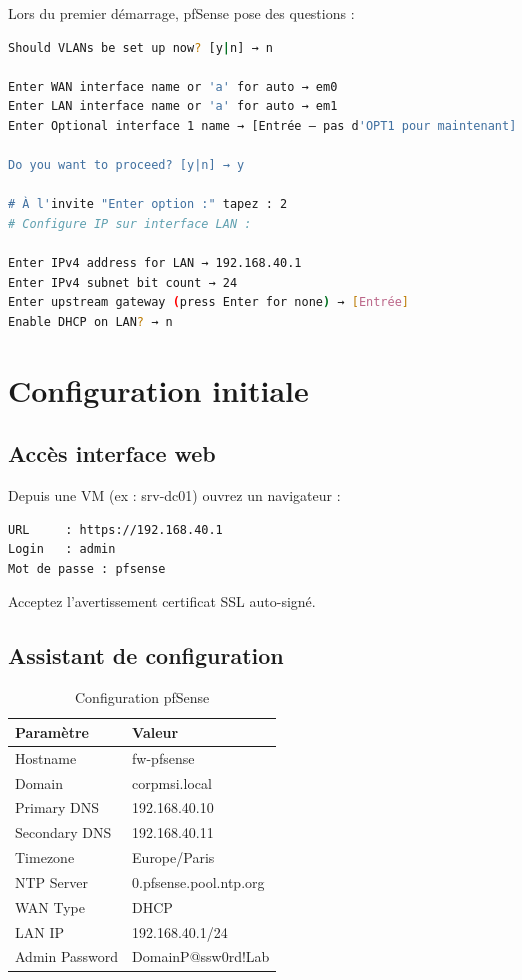 Lors du premier démarrage, pfSense pose des questions :

\begin{lstlisting}[language=bash]
Should VLANs be set up now? [y|n] → n

Enter WAN interface name or 'a' for auto → em0
Enter LAN interface name or 'a' for auto → em1
Enter Optional interface 1 name → [Entrée — pas d'OPT1 pour maintenant]

Do you want to proceed? [y|n] → y

# À l'invite "Enter option :" tapez : 2
# Configure IP sur interface LAN :

Enter IPv4 address for LAN → 192.168.40.1
Enter IPv4 subnet bit count → 24
Enter upstream gateway (press Enter for none) → [Entrée]
Enable DHCP on LAN? → n
\end{lstlisting}

\section{Configuration initiale}

\subsection{Accès interface web}

Depuis une VM (ex : srv-dc01) ouvrez un navigateur :

\begin{lstlisting}
URL     : https://192.168.40.1
Login   : admin
Mot de passe : pfsense
\end{lstlisting}

Acceptez l'avertissement certificat SSL auto-signé.

\subsection{Assistant de configuration}

\begin{table}[H]
    \centering
    \begin{tabularx}{\textwidth}{|l|p{5cm}|}
        \hline
        \textbf{Paramètre} & \textbf{Valeur} \\
        \hline
        Hostname & fw-pfsense \\
        \hline
        Domain & corpmsi.local \\
        \hline
        Primary DNS & 192.168.40.10 \\
        \hline
        Secondary DNS & 192.168.40.11 \\
        \hline
        Timezone & Europe/Paris \\
        \hline
        NTP Server & 0.pfsense.pool.ntp.org \\
        \hline
        WAN Type & DHCP \\
        \hline
        LAN IP & 192.168.40.1/24 \\
        \hline
        Admin Password & DomainP@ssw0rd!Lab \\
        \hline
    \end{tabularx}
    \caption{Configuration pfSense}
    \label{tab:pfsense-config}
\end{table}

